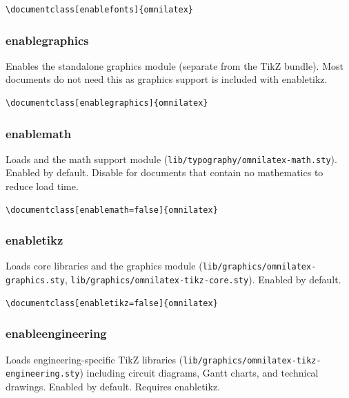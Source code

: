 \begin{verbatim}
\documentclass[enablefonts]{omnilatex}
\end{verbatim}

\subsubsection{\textsf{enablegraphics}}

Enables the standalone graphics module (separate from the TikZ bundle).
Most documents do not need this as graphics support is included with
\textsf{enabletikz}.

\begin{verbatim}
\documentclass[enablegraphics]{omnilatex}
\end{verbatim}

\subsubsection{\textsf{enablemath}}

Loads  and the math support module
(\texttt{lib/typography/omnilatex-math.sty}).  Enabled by default.
Disable for documents that contain no mathematics to reduce load time.

\begin{verbatim}
\documentclass[enablemath=false]{omnilatex}
\end{verbatim}

\subsubsection{\textsf{enabletikz}}

Loads  core libraries and the graphics module
(\texttt{lib/graphics/omnilatex-graphics.sty},
\texttt{lib/graphics/omnilatex-tikz-core.sty}).  Enabled by default.

\begin{verbatim}
\documentclass[enabletikz=false]{omnilatex}
\end{verbatim}

\subsubsection{\textsf{enableengineering}}

Loads engineering-specific TikZ libraries
(\texttt{lib/graphics/omnilatex-tikz-engineering.sty}) including
circuit diagrams, Gantt charts, and technical drawings.  Enabled by
default.  Requires \textsf{enabletikz}.

